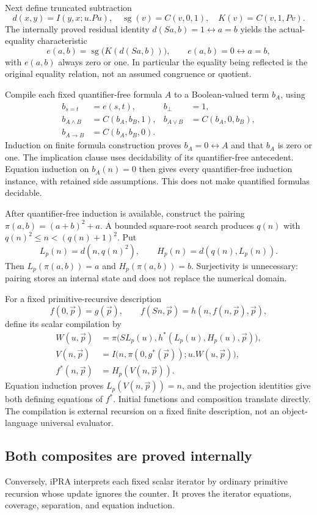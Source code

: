 \documentclass[11pt,letterpaper]{article}
\theoremstyle{definition}
\newcommand{\ipra}{\mathrm{iPRA}}
\begin{document}
Next define truncated subtraction
\[
 d(x,y)=I(y,x;u.Pu),\quad
 \operatorname{sg}(v)=C(v,0,1),\quad K(v)=C(v,1,Pv).
\]
The internally proved residual identity
$d(Sa,b)=1\leftrightarrow a=b$ yields the actual-equality characteristic
\[
 e(a,b)=\operatorname{sg}\bigl(K(d(Sa,b))\bigr),\qquad
 e(a,b)=0\leftrightarrow a=b,
\]
with $e(a,b)$ always zero or one. In particular the equality being reflected
is the original equality relation, not an assumed congruence or quotient.

Compile each fixed quantifier-free formula $A$ to a Boolean-valued term
$b_A$, using
\begin{align*}
 b_{s=t}&=e(s,t),&b_\bot&=1,\\
 b_{A\wedge B}&=C(b_A,b_B,1),&
 b_{A\vee B}&=C(b_A,0,b_B),\\
 b_{A\to B}&=C(b_A,b_B,0).
\end{align*}
Induction on finite formula construction proves $b_A=0\leftrightarrow A$
and that $b_A$ is zero or one. The implication clause uses decidability of
its quantifier-free antecedent. Equation induction on $b_A(n)=0$ then
gives every quantifier-free induction instance, with retained side
assumptions. This does not make quantified formulas decidable.

After quantifier-free induction is available, construct the pairing
$\pi(a,b)=(a+b)^2+a$. A bounded square-root search produces $q(n)$ with
$q(n)^2\le n<(q(n)+1)^2$. Put
\[
 L_p(n)=d(n,q(n)^2),\qquad H_p(n)=d(q(n),L_p(n)).
\]
Then $L_p(\pi(a,b))=a$ and $H_p(\pi(a,b))=b$. Surjectivity is unnecessary:
pairing stores an internal state and does not replace the numerical domain.

For a fixed primitive-recursive description
\[
 f(0,\vec p)=g(\vec p),\qquad
 f(Sn,\vec p)=h(n,f(n,\vec p),\vec p),
\]
define its scalar compilation by
\begin{align*}
 W(u,\vec p)&=\pi\bigl(SL_p(u),h^*(L_p(u),H_p(u),\vec p)\bigr),\\
 V(n,\vec p)&=I\bigl(n,\pi(0,g^*(\vec p));u.W(u,\vec p)\bigr),\\
 f^*(n,\vec p)&=H_p(V(n,\vec p)).
\end{align*}
Equation induction proves $L_p(V(n,\vec p))=n$, and the projection
identities give both defining equations of $f^*$. Initial functions and
composition translate directly. The compilation is external recursion on
a fixed finite description, not an object-language universal evaluator.

\subsection{Both composites are proved internally}
Conversely, $\ipra$ interprets each fixed scalar iterator by ordinary
primitive recursion whose update ignores the counter. It proves the
iterator equations, coverage, separation, and equation induction.
\end{document}
